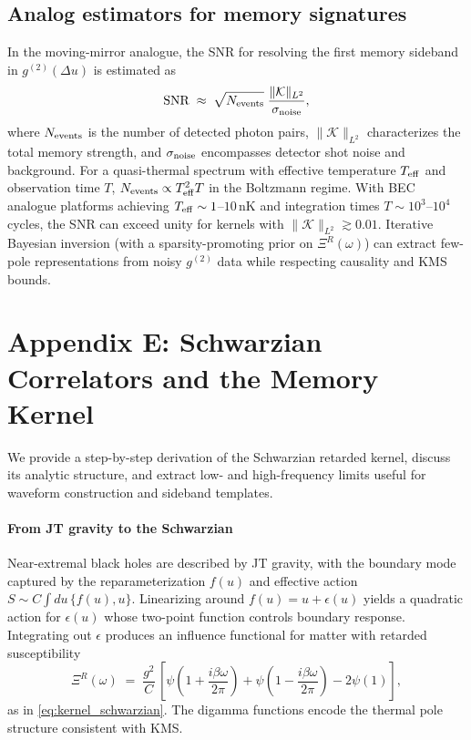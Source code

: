 \documentclass[a4paper,11pt]{article}
\theoremstyle{plain}
\theoremstyle{definition}
\theoremstyle{remark}
\begin{document}
\subsection{Analog estimators for memory signatures}
\label{app:analog-estimator}
In the moving-mirror analogue, the SNR for resolving the first memory sideband in $g^{(2)}(\Delta u)$ is estimated as
\begin{equation}
\mathrm{SNR}\;\approx\;\sqrt{N_{\rm events}}\;\frac{\|\mathcal{K}\|_{L^2}}{\sigma_{\rm noise}},
\end{equation}
where $N_{\rm events}$ is the number of detected photon pairs, $\|\mathcal{K}\|_{L^2}$ characterizes the total memory strength, and $\sigma_{\rm noise}$ encompasses detector shot noise and background. For a quasi-thermal spectrum with effective temperature $T_{\rm eff}$ and observation time $T$, $N_{\rm events} \propto T_{\rm eff}^2 T$ in the Boltzmann regime. With BEC analogue platforms achieving $T_{\rm eff}\sim 1$--$10\,\mathrm{nK}$ and integration times $T\sim 10^3$--$10^4$ cycles, the SNR can exceed unity for kernels with $\|\mathcal{K}\|_{L^2}\gtrsim 0.01$. Iterative Bayesian inversion (with a sparsity-promoting prior on $\Xi^R(\omega)$) can extract few-pole representations from noisy $g^{(2)}$ data while respecting causality and KMS bounds.

\section{Appendix E: Schwarzian Correlators and the Memory Kernel}
\label{app:schwarzian_appendix}
We provide a step-by-step derivation of the Schwarzian retarded kernel, discuss its analytic structure, and extract low- and high-frequency limits useful for waveform construction and sideband templates.

\paragraph{From JT gravity to the Schwarzian}
Near-extremal black holes are described by JT gravity, with the boundary mode captured by the reparameterization $f(u)$ and effective action $S\!\sim\!C\!\int du\,\{f(u),u\}$. Linearizing around $f(u)=u+\epsilon(u)$ yields a quadratic action for $\epsilon(u)$ whose two-point function controls boundary response. Integrating out $\epsilon$ produces an influence functional for matter with retarded susceptibility
\begin{equation}
\Xi^R(\omega)\;=\;\frac{g^2}{C}\,\left[\psi\!\left(1+\frac{i\beta\omega}{2\pi}\right)+\psi\!\left(1-\frac{i\beta\omega}{2\pi}\right)-2\psi(1)\right],
\end{equation}
as in \eqref{eq:kernel_schwarzian}. The digamma functions encode the thermal pole structure consistent with KMS.
\end{document}
